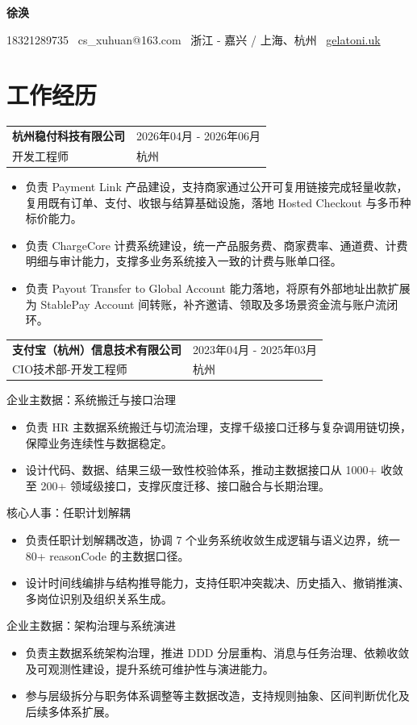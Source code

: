 \documentclass[10pt]{article}
\makeatletter
\newcommand{\resumeEntry}[4]{
  \begin{tabularx}{\textwidth}{@{}X>{\raggedleft\arraybackslash}p{5.2cm}@{}}
    {\fontsize{11.5}{13.5}\selectfont\bfseries\color{heading} #1} & {\small\color{subtle} #3} \\
    {\small\color{textgray} #2} & {\small\color{textgray} #4} \\
  \end{tabularx}
  \vspace{2pt}
}
\newcommand{\projectTitle}[1]{
  {\normalsize\color{heading} #1}\par
  \vspace{2pt}
}
\newcommand{\projectGap}{
  \vspace{5pt}
}
\makeatother
\begin{document}
{\LARGE\bfseries 徐涣}\par
\vspace{2pt}
{\small 18321289735 \textbar\ cs\_xuhuan@163.com \textbar\ 浙江 - 嘉兴 / 上海、杭州 \textbar\ \href{https://gelatoni.uk}{gelatoni.uk}}\par

\section{工作经历}

\resumeEntry
  {杭州稳付科技有限公司}
  {开发工程师}
  {2026年04月 - 2026年06月}
  {杭州}

\begin{itemize}
  \item 负责 Payment Link 产品建设，支持商家通过公开可复用链接完成轻量收款，复用既有订单、支付、收银与结算基础设施，落地 Hosted Checkout 与多币种标价能力。
  \item 负责 ChargeCore 计费系统建设，统一产品服务费、商家费率、通道费、计费明细与审计能力，支撑多业务系统接入一致的计费与账单口径。
  \item 负责 Payout Transfer to Global Account 能力落地，将原有外部地址出款扩展为 StablePay Account 间转账，补齐邀请、领取及多场景资金流与账户流闭环。
\end{itemize}
\projectGap

\resumeEntry
  {支付宝（杭州）信息技术有限公司}
  {CIO技术部-开发工程师}
  {2023年04月 - 2025年03月}
  {杭州}

\projectTitle{企业主数据：系统搬迁与接口治理}
\begin{itemize}
  \item 负责 HR 主数据系统搬迁与切流治理，支撑千级接口迁移与复杂调用链切换，保障业务连续性与数据稳定。
  \item 设计代码、数据、结果三级一致性校验体系，推动主数据接口从 1000+ 收敛至 200+ 领域级接口，支撑灰度迁移、接口融合与长期治理。
\end{itemize}
\projectGap

\projectTitle{核心人事：任职计划解耦}
\begin{itemize}
  \item 负责任职计划解耦改造，协调 7 个业务系统收敛生成逻辑与语义边界，统一 80+ reasonCode 的主数据口径。
  \item 设计时间线编排与结构推导能力，支持任职冲突裁决、历史插入、撤销推演、多岗位识别及组织关系生成。
\end{itemize}
\projectGap

\projectTitle{企业主数据：架构治理与系统演进}
\begin{itemize}
  \item 负责主数据系统架构治理，推进 DDD 分层重构、消息与任务治理、依赖收敛及可观测性建设，提升系统可维护性与演进能力。
  \item 参与层级拆分与职务体系调整等主数据改造，支持规则抽象、区间判断优化及后续多体系扩展。
\end{itemize}
\projectGap
\end{document}
